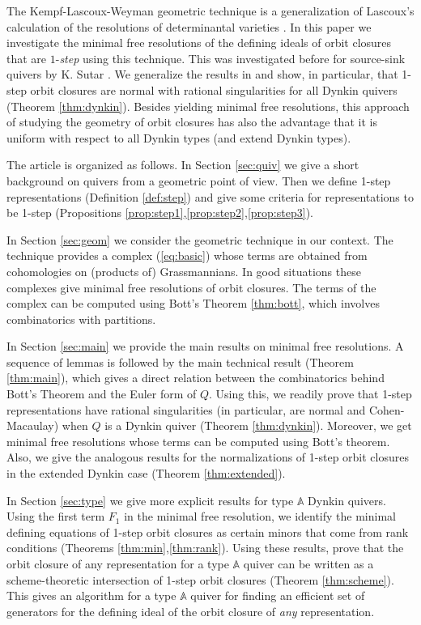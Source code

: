 \documentclass[twoside]{article}
\newcommand{\A}{\mathbb{A}}
\theoremstyle{definition}
\begin{document}
The Kempf-Lascoux-Weyman geometric technique is a generalization of Lascoux's calculation of the resolutions of determinantal varieties \cite{lasc}.  In this paper we investigate the minimal free resolutions of the defining ideals of orbit closures that are $1$-\textit{step} using this technique. This was investigated before for source-sink quivers by K. Sutar \cite{kavita2,kavita}. We generalize the results in \cite{kavita} and show, in particular, that 1-step orbit closures are normal with rational singularities for all Dynkin quivers (Theorem \ref{thm:dynkin}). Besides yielding minimal free resolutions, this approach of studying the geometry of orbit closures has also the advantage that it is uniform with respect to all Dynkin types (and extend Dynkin types).

The article is organized as follows. In Section \ref{sec:quiv} we give a short background on quivers from a geometric point of view. Then we define 1-step representations (Definition \ref{def:step}) and give some criteria for representations to be 1-step (Propositions \ref{prop:step1},\ref{prop:step2},\ref{prop:step3}).

In Section \ref{sec:geom} we consider the geometric technique in our context. The technique provides a complex (\ref{eq:basic}) whose terms are obtained from cohomologies on (products of) Grassmannians. In good situations these complexes give minimal free resolutions of orbit closures. The terms of the complex can be computed using Bott's Theorem \ref{thm:bott}, which involves combinatorics with partitions.

In Section \ref{sec:main} we provide the main results on minimal free resolutions. A sequence of lemmas is followed by the main technical result (Theorem \ref{thm:main}), which gives a direct relation between the combinatorics behind Bott's Theorem and the Euler form of $Q$. Using this, we readily prove that 1-step representations have rational singularities (in particular, are normal and Cohen-Macaulay) when $Q$ is a Dynkin quiver (Theorem \ref{thm:dynkin}). Moreover, we get minimal free resolutions whose terms can be computed using Bott's theorem. Also, we give the analogous results for the normalizations of 1-step orbit closures in the extended Dynkin case (Theorem \ref{thm:extended}).

In Section \ref{sec:type} we give more explicit results for type $\A$ Dynkin quivers. Using the first term $F_1$ in the minimal free resolution, we identify the minimal defining equations of 1-step orbit closures as certain minors that come from rank conditions (Theorems \ref{thm:min},\ref{thm:rank}). Using these results, prove that the orbit closure of any representation for a type $\A$ quiver can be written as a scheme-theoretic intersection of 1-step orbit closures (Theorem \ref{thm:scheme}). This gives an algorithm for a type $\A$ quiver for finding an efficient set of generators for the defining ideal of the orbit closure of \textit{any} representation.
\end{document}
